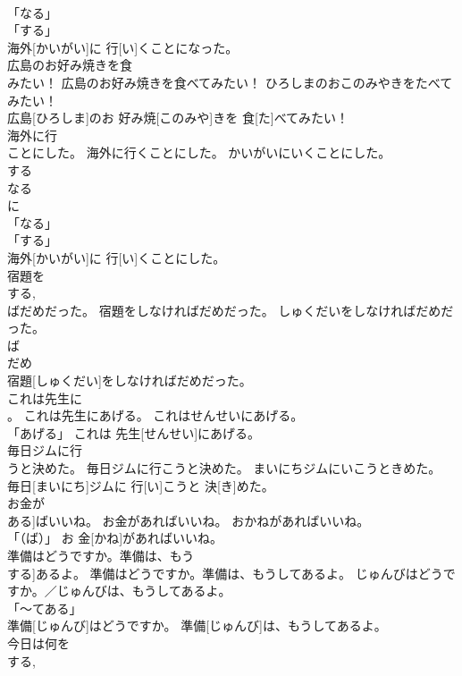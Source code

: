 \documentclass[8pt]{extreport}
\begin{document}
\begin{CJK}{UTF8}{min}
\\	「なる」 
\\	「する」 
\\	海外[かいがい]に 行[い]くことになった。		
\\	広島のお好み焼きを食
\\	みたい！	広島のお好み焼きを食べてみたい！	ひろしまのおこのみやきをたべてみたい！	
\\	広島[ひろしま]のお 好み焼[このみや]きを 食[た]べてみたい！		
\\	海外に行
\\	ことにした。	海外に行くことにした。	かいがいにいくことにした。	
\\	する 
\\	なる 
\\	に 
\\	「なる」 
\\	「する」 
\\	海外[かいがい]に 行[い]くことにした。		
\\	宿題を
\\	する, 
\\	ばだめだった。	宿題をしなければだめだった。	しゅくだいをしなければだめだった。	
\\	ば
\\	だめ
\\	宿題[しゅくだい]をしなければだめだった。		
\\	これは先生に
\\	。	これは先生にあげる。	これはせんせいにあげる。	
\\	「あげる」	これは 先生[せんせい]にあげる。		
\\	毎日ジムに行
\\	うと決めた。	毎日ジムに行こうと決めた。	まいにちジムにいこうときめた。	
\\	毎日[まいにち]ジムに 行[い]こうと 決[き]めた。		
\\	お金が
\\	ある]ばいいね。	お金があればいいね。	おかねがあればいいね。	
\\	「（ば）」	お 金[かね]があればいいね。		
\\	準備はどうですか。準備は、もう
\\	する]あるよ。	準備はどうですか。準備は、もうしてあるよ。	じゅんびはどうですか。／じゅんびは、もうしてあるよ。	
\\	「～てある」 
\\	準備[じゅんび]はどうですか。 準備[じゅんび]は、もうしてあるよ。		
\\	今日は何を
\\	する, 

\end{CJK}
\end{document}
